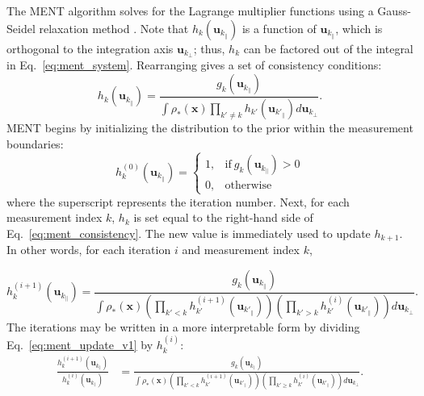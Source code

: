 \documentclass[%
    reprint,
    twocolumn,
    amsmath,
    amssymb,
    aps,
    prstab,
]{revtex4-2}
\newcommand\ddfrac[2]{\frac{\displaystyle #1}{\displaystyle #2}}
\begin{document}
The MENT algorithm solves for the Lagrange multiplier functions using a Gauss-Seidel relaxation method \cite{Minerbo_1979}. Note that $h_k(\bm{u}_{k_\parallel})$ is a function of $\bm{u}_{k_\parallel}$, which is orthogonal to the integration axis $\bm{u}_{k_\perp}$; thus, $h_k$ can be factored out of the integral in Eq.~\eqref{eq:ment_system}. Rearranging gives a set of consistency conditions:
%
\begin{equation} \label{eq:ment_consistency}
    h_k ( \bm{u}_{k_\parallel} ) =
    \ddfrac
    {
        {g}_k(\bm{u}_{k_\parallel})
    }
    {
        \int 
        \rho_*(\bm{x})
        \prod_{k' \ne k} h_{k'} ( \bm{u}_{k'_\parallel}  )
        d\bm{u}_{k_\perp}
    }.
\end{equation}
%
MENT begins by initializing the distribution to the prior within the measurement boundaries:
%
\begin{equation} \label{eq:ment_initialization}
    h_{k}^{(0)}(\bm{u}_{k_\parallel}) = 
    \begin{cases}
        1, & \text{if}\ {g}_k(\bm{u}_{{k}_\parallel}) > 0  \\
        0, & \text{otherwise}
    \end{cases}
\end{equation}
%
where the superscript represents the iteration number. Next, for each measurement index $k$, $h_k$ is set equal to the right-hand side of Eq.~\eqref{eq:ment_consistency}. The new value is immediately used to update $h_{k + 1}$. In other words, for each iteration $i$ and measurement index $k$,
%
\begin{widetext}
\begin{equation} \label{eq:ment_update_v1}
    h_k^{(i + 1)} ( \bm{u}_{k_\parallel} ) =
    \ddfrac
    {
        {g}_k(\bm{u}_{k_\parallel})
    }
    {
        \int 
        \rho_*(\bm{x})
        \left(
            \prod_{k' < k} h_{k'}^{(i + 1)} ( \bm{u}_{k'_\parallel} )
        \right)
        \left(
            \prod_{k' > k} h_{k'}^{(i)} ( \bm{u}_{k'_\parallel} )
        \right)
        d\bm{u}_{k_\perp}
    }.
\end{equation}
%
The iterations may be written in a more interpretable form by dividing Eq.~\eqref{eq:ment_update_v1} by $h_k^{(i)}$:
%
\begin{equation} \label{eq:ment_update_v2}
\begin{aligned}
    \frac{
        h_k^{(i + 1)} ( \bm{u}_{k_\parallel} )
    }
    {
        h_k^{(i    )} ( \bm{u}_{k_\parallel} )
    }
    &=
    \ddfrac
    {
        {g}_k(\bm{u}_{k_\parallel})
    }
    {
        \int 
        \rho_*(\bm{x})
        \left(
            \prod_{k' < k} h_{k'}^{(i + 1)} ( \bm{u}_{{k'}_\parallel} )
        \right)
        \left(
            \prod_{k' \geq k} h_{k'}^{(i)} ( \bm{u}_{{k'}_\parallel} )
        \right)
        d\bm{u}_{k_\perp}
    }
    .
\end{aligned}
\end{equation}
\end{widetext}
\end{document}
